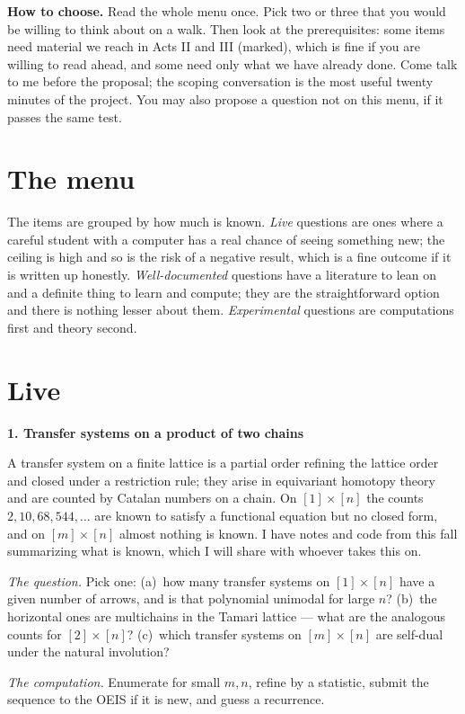 \documentclass[11pt]{amsart}
\newcommand{\project}[5]{%
  \medskip\noindent\textbf{#1}\quad{\small\textit{#2}}\par\smallskip
  \noindent #3\par\smallskip
  \noindent\textit{The question.} #4\par\smallskip
  \noindent\textit{The computation.} #5\par}
\begin{document}
\medskip\noindent\textbf{How to choose.} Read the whole menu once. Pick two or three that you
would be willing to think about on a walk. Then look at the prerequisites: some items need
material we reach in Acts II and III (marked), which is fine if you are willing to read ahead,
and some need only what we have already done. Come talk to me before the proposal; the
scoping conversation is the most useful twenty minutes of the project. You may also propose a
question not on this menu, if it passes the same test.

\section*{The menu}

The items are grouped by how much is known. \emph{Live} questions are ones where a careful
student with a computer has a real chance of seeing something new; the ceiling is high and so
is the risk of a negative result, which is a fine outcome if it is written up honestly.
\emph{Well-documented} questions have a literature to lean on and a definite thing to learn
and compute; they are the straightforward option and there is nothing lesser about them.
\emph{Experimental} questions are computations first and theory second.

\section*{Live}

\project{1. Transfer systems on a product of two chains}
{Acts I--III; the course's own research thread}
{A transfer system on a finite lattice is a partial order refining the lattice order and
closed under a restriction rule; they arise in equivariant homotopy theory and are counted by
Catalan numbers on a chain. On $[1]\times[n]$ the counts $2,10,68,544,\dots$ are known to
satisfy a functional equation but no closed form, and on $[m]\times[n]$ almost nothing is
known. I have notes and code from this fall summarizing what is known, which I will share with
whoever takes this on.}
{Pick one: (a)~how many transfer systems on $[1]\times[n]$ have a given number of arrows, and
is that polynomial unimodal for large $n$? (b)~the horizontal ones are multichains in the
Tamari lattice --- what are the analogous counts for $[2]\times[n]$? (c)~which transfer systems
on $[m]\times[n]$ are self-dual under the natural involution?}
{Enumerate for small $m,n$, refine by a statistic, submit the sequence to the OEIS if it is
new, and guess a recurrence.}
\end{document}
